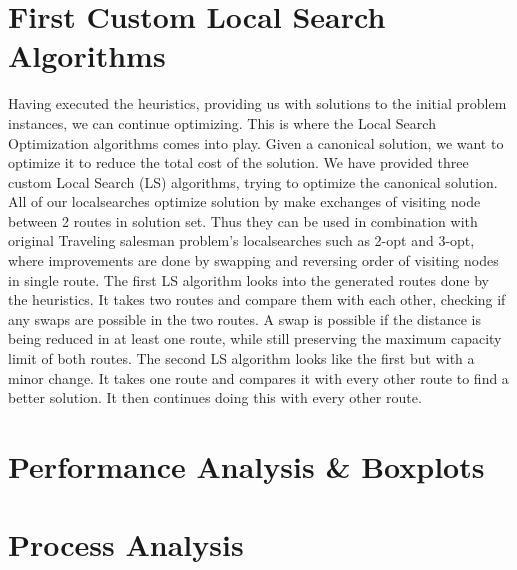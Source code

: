 \documentclass[12pt]{article}
\begin{document}
\newpage
\section{First Custom Local Search Algorithms}
Having executed the heuristics, providing us with solutions to the initial problem instances, we can continue optimizing. This is where the Local Search Optimization algorithms comes into play. 
Given a canonical solution, we want to optimize it to reduce the total cost of the solution. We have provided three custom Local Search (LS) algorithms, trying to optimize the canonical solution.
All of our localsearches optimize solution by make exchanges of visiting node between 2 routes in solution set. Thus they can be used in combination with original Traveling salesman problem's localsearches such as 2-opt and 3-opt, where improvements are done by swapping and reversing order of visiting nodes in single route.
\newline
The first LS algorithm looks into the generated routes done by the heuristics. It takes two routes and compare them with each other, checking if any swaps are possible in the two routes. 
A swap is possible if the distance is being reduced in at least one route, while still preserving the maximum capacity limit of both routes. 
The second LS algorithm looks like the first but with a minor change. It takes one route and compares it with every other route to find a better solution. It then continues doing this 
with every other route. 


\section{Performance Analysis \& Boxplots}

\section{Process Analysis}

\newpage


\end{document}
